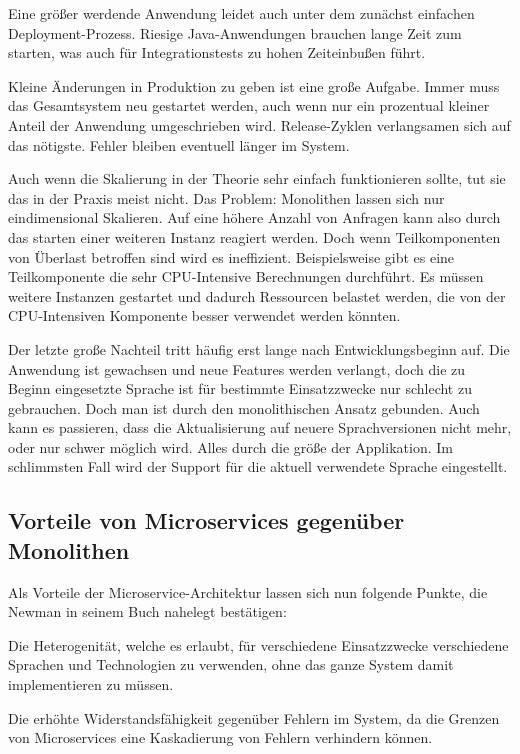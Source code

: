 \documentclass[12pt,a4paper,bibliography=totocnumbered,listof=totocnumbered]{scrartcl}
\begin{document}
Eine größer werdende Anwendung leidet auch unter dem zunächst einfachen Deployment-Prozess. Riesige Java-Anwendungen brauchen lange Zeit zum starten, was auch für Integrationstests zu hohen Zeiteinbußen führt.

Kleine Änderungen in Produktion zu geben ist eine große Aufgabe. Immer muss das Gesamtsystem neu gestartet werden, auch wenn nur ein prozentual kleiner Anteil der Anwendung umgeschrieben wird. Release-Zyklen verlangsamen sich auf das nötigste. Fehler bleiben eventuell länger im System.

Auch wenn die Skalierung in der Theorie sehr einfach funktionieren sollte, tut sie das in der Praxis meist nicht. Das Problem: Monolithen lassen sich nur eindimensional Skalieren. Auf eine höhere Anzahl von Anfragen kann also durch das starten einer weiteren Instanz reagiert werden. Doch wenn Teilkomponenten von Überlast betroffen sind wird es ineffizient. Beispielsweise gibt es eine Teilkomponente die sehr CPU-Intensive Berechnungen durchführt. Es müssen weitere Instanzen gestartet und dadurch Ressourcen belastet werden, die von der CPU-Intensiven Komponente besser verwendet werden könnten.

Der letzte große Nachteil tritt häufig erst lange nach Entwicklungsbeginn auf. Die Anwendung ist gewachsen und neue Features werden verlangt, doch die zu Beginn eingesetzte Sprache ist für bestimmte Einsatzzwecke nur schlecht zu gebrauchen. Doch man ist durch den monolithischen Ansatz gebunden. Auch kann es passieren, dass die Aktualisierung auf neuere Sprachversionen nicht mehr, oder nur schwer möglich wird. Alles durch die größe der Applikation. Im schlimmsten Fall wird der Support für die aktuell verwendete Sprache eingestellt.\cite{richardson}

\subsection{Vorteile von Microservices gegenüber Monolithen}\label{ch:ms-mon-pro}

Als Vorteile der Microservice-Architektur lassen sich nun folgende Punkte, die Newman in seinem Buch nahelegt bestätigen\cite{buildingms}:

Die Heterogenität, welche es erlaubt, für verschiedene Einsatzzwecke verschiedene Sprachen und Technologien zu verwenden, ohne das ganze System damit implementieren zu müssen.

Die erhöhte Widerstandsfähigkeit gegenüber Fehlern im System, da die Grenzen von Microservices eine Kaskadierung von Fehlern verhindern können.
\end{document}
